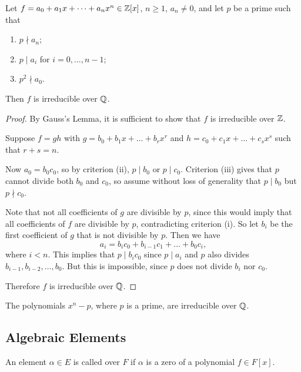 \begin{theorem}
	Let $f = a_0 + a_1 x + \dots + a_n x^n \in \mathbb{Z}[x]$, $n \geq 1$, $a_n \neq 0$, and let $p$ be a prime such that
	\begin{enumerate}
		\item $p \nmid a_n$;
		\item $p \mid a_i$ for $i = 0, \dots, n - 1$;
		\item $p^2 \nmid a_0$.
	\end{enumerate}
	Then $f$ is irreducible over $\mathbb{Q}$.
	\begin{proof}
		By Gauss's Lemma, it is sufficient to show that $f$ is irreducible over $\mathbb{Z}$.
		
		Suppose $f = gh$ with $g = b_0 + b_1 x + \dots + b_r x^r$ and $h = c_0 + c_1 x + \dots + c_s x^s$ such that $r + s = n$.
		
		Now $a_0 = b_0 c_0$, so by criterion (ii), $p \mid b_0$ or $p \mid c_0$. Criterion (iii) gives that $p$ cannot divide both $b_0$ and $c_0$, so assume without loss of generality that $p \mid b_0$ but $p \nmid c_0$.
		
		Note that not all coefficients of $g$ are divisible by $p$, since this would imply that all coefficients of $f$ are divisible by $p$, contradicting criterion (i). So let $b_i$ be the first coefficient of $g$ that is not divisible by $p$. Then we have
		\[
			a_i = b_i c_0 + b_{i - 1} c_1 + \dots + b_0 c_i,
		\]
		where $i < n$. This implies that $p \mid b_i c_0$ since $p \mid a_i$ and $p$ also divides $b_{i - 1}, b_{i - 2}, \dots, b_0$. But this is impossible, since $p$ does not divide $b_i$ nor $c_0$.
		
		Therefore $f$ is irreducible over $\mathbb{Q}$.
	\end{proof}
\end{theorem}

\begin{corollary}
	The polynomials $x^n - p$, where $p$ is a prime, are irreducible over $\mathbb{Q}$.
\end{corollary}

\subsection{Algebraic Elements}
\begin{definition}
	An element $\alpha \in E$ is called  over $F$ if $\alpha$ is a zero of a polynomial $f \in F[x]$.
\end{definition}

